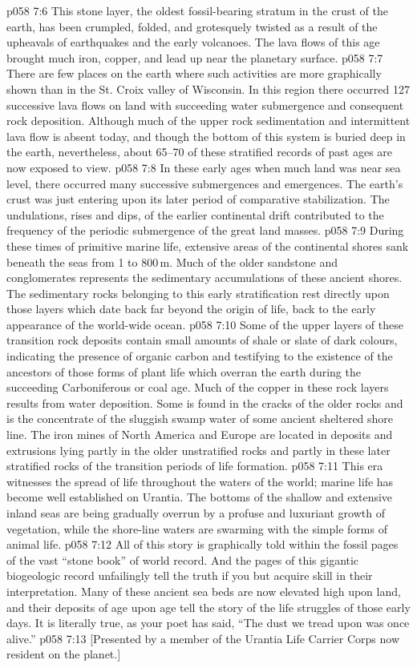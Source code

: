 \vs p058 7:6 This stone layer, the oldest fossil\hyp{}bearing stratum in the crust of the earth, has been crumpled, folded, and grotesquely twisted as a result of the upheavals of earthquakes and the early volcanoes. The lava flows of this age brought much iron, copper, and lead up near the planetary surface.
\vs p058 7:7 There are few places on the earth where such activities are more graphically shown than in the St. Croix valley of Wisconsin. In this region there occurred 127 successive lava flows on land with succeeding water submergence and consequent rock deposition. Although much of the upper rock sedimentation and intermittent lava flow is absent today, and though the bottom of this system is buried deep in the earth, nevertheless, about 65--70 of these stratified records of past ages are now exposed to view.
\vs p058 7:8 \pc In these early ages when much land was near sea level, there occurred many successive submergences and emergences. The earth’s crust was just entering upon its later period of comparative stabilization. The undulations, rises and dips, of the earlier continental drift contributed to the frequency of the periodic submergence of the great land masses.
\vs p058 7:9 During these times of primitive marine life, extensive areas of the continental shores sank beneath the seas from 1 to 800\,m. Much of the older sandstone and conglomerates represents the sedimentary accumulations of these ancient shores. The sedimentary rocks belonging to this early stratification rest directly upon those layers which date back far beyond the origin of life, back to the early appearance of the world\hyp{}wide ocean.
\vs p058 7:10 Some of the upper layers of these transition rock deposits contain small amounts of shale or slate of dark colours, indicating the presence of organic carbon and testifying to the existence of the ancestors of those forms of plant life which overran the earth during the succeeding Carboniferous or coal age. Much of the copper in these rock layers results from water deposition. Some is found in the cracks of the older rocks and is the concentrate of the sluggish swamp water of some ancient sheltered shore line. The iron mines of North America and Europe are located in deposits and extrusions lying partly in the older unstratified rocks and partly in these later stratified rocks of the transition periods of life formation.
\vs p058 7:11 \pc This era witnesses the spread of life throughout the waters of the world; marine life has become well established on Urantia. The bottoms of the shallow and extensive inland seas are being gradually overrun by a profuse and luxuriant growth of vegetation, while the shore\hyp{}line waters are swarming with the simple forms of animal life.
\vs p058 7:12 \pc All of this story is graphically told within the fossil pages of the vast “stone book” of world record. And the pages of this gigantic biogeologic record unfailingly tell the truth if you but acquire skill in their interpretation. Many of these ancient sea beds are now elevated high upon land, and their deposits of age upon age tell the story of the life struggles of those early days. It is literally true, as your poet has said, “The dust we tread upon was once alive.”
\vsetoff
\vs p058 7:13 [Presented by a member of the Urantia Life Carrier Corps now resident on the planet.]
